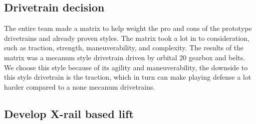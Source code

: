 \documentclass{article}
\begin{document}
\subsection{Drivetrain decision}
The entire team made a matrix to help weight the pro and cons of the prototype drivetrains and already proven styles. The matrix took a lot in to consideration, such as traction, strength, maneuverability, and complexity. The results of the matrix was a mecanum style drivetrain driven by orbital 20 gearbox and belts. We choose this style because of its agility and maneuverability, the downside to this style drivetrain is the traction, which in turn can make playing defense a lot harder compared to a none mecanum drivetrains.  


\subsection{Develop X-rail based lift}
\end{document}
